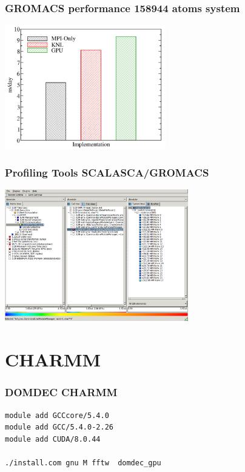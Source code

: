 \begin{frame}
	\frametitle{GROMACS performance 158944 atoms system}
        \begin{center}
		\includegraphics[width=7cm]{images/profiling_gromacs.png}
        \end{center}
\end{frame}


\begin{frame}
	\frametitle{Profiling Tools SCALASCA/GROMACS}
        \begin{center}
		\includegraphics[width=8cm]{images/cube_gromacs.png}
        \end{center}
\end{frame}



\section{CHARMM}
\begin{frame}[fragile]
	\frametitle{DOMDEC CHARMM}
  
        \begin{verbatim}             
module add GCCcore/5.4.0    
module add GCC/5.4.0-2.26   
module add CUDA/8.0.44

./install.com gnu M fftw  domdec_gpu
        \end{verbatim}

\end{frame}


